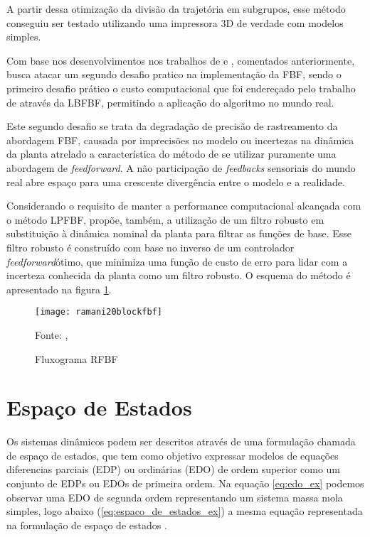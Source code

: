 A partir dessa otimização da divisão da trajetória em subgrupos, esse método conseguiu ser testado utilizando uma impressora 3D de verdade com modelos simples.

Com base nos desenvolvimentos nos trabalhos de \cite{ramani17} e \cite{duan18}, comentados anteriormente, \cite{ramani20} busca atacar um segundo desafio pratico na implementação da FBF, sendo o primeiro desafio prático o custo computacional que foi endereçado pelo trabalho de \cite{duan18} através da LBFBF, permitindo a aplicação do algoritmo no mundo real.

Este segundo desafio se trata da degradação de precisão de rastreamento da abordagem FBF, causada por imprecisões no modelo ou incertezas na dinâmica da planta atrelado a característica do método de se utilizar puramente uma abordagem de \textit{feedforward}. A não participação de \textit{feedbacks} sensoriais do mundo real abre espaço para uma crescente divergência entre o modelo e a realidade.

Considerando o requisito de manter a performance computacional alcançada com o método LPFBF, \cite{ramani20} propõe, também, a utilização de um filtro robusto em substituição à dinâmica nominal da planta para filtrar as funções de base. Esse filtro robusto é construído com base no inverso de um controlador \textit{feedforward}ótimo, que minimiza uma função de custo de erro para lidar com a incerteza conhecida da planta como um filtro robusto. O esquema do método é apresentado na figura \ref{fig:flowchart_rfbf}.

\begin{figure}[H]
    \centering
    \caption{Fluxograma RFBF}
    \texttt{[image: ramani20blockfbf]}

    {\footnotesize Fonte: \citeauthor{ramani20}, \citeyear{ramani20}}
    \label{fig:flowchart_rfbf}
\end{figure}

\section{Espaço de Estados}

Os sistemas dinâmicos podem ser descritos através de uma formulação chamada de espaço de estados, que tem como objetivo expressar modelos de equações diferencias parciais (EDP) ou ordinárias (EDO) de ordem superior como um conjunto de EDPs ou EDOs de primeira ordem. Na equação \ref{eq:edo_ex} podemos observar uma EDO de segunda ordem representando um sistema massa mola simples, logo abaixo (\ref{eq:espaco_de_estados_ex}) a mesma equação representada na formulação de espaço de estados \cite{hamilton94}.

